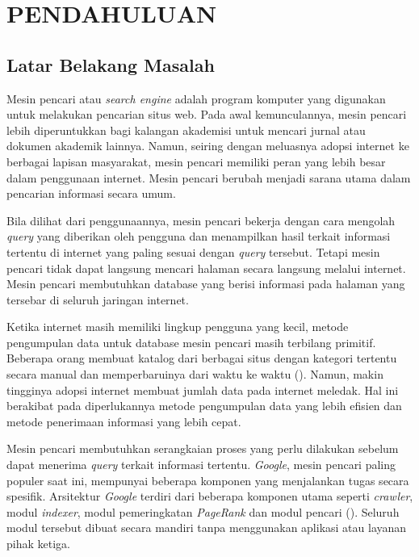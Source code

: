 
\chapter{PENDAHULUAN}

\section{Latar Belakang Masalah}

Mesin pencari atau \emph{search engine} adalah program komputer yang digunakan 
untuk melakukan pencarian situs web. Pada awal kemunculannya, mesin pencari
lebih diperuntukkan bagi kalangan akademisi untuk mencari jurnal atau dokumen
akademik lainnya. Namun, seiring dengan meluasnya adopsi internet ke berbagai
lapisan masyarakat, mesin pencari memiliki peran yang lebih besar dalam
penggunaan internet. Mesin pencari berubah menjadi sarana utama dalam pencarian
informasi secara umum.

Bila dilihat dari penggunaannya, mesin pencari bekerja dengan cara mengolah
\emph{query} yang diberikan oleh pengguna dan menampilkan hasil terkait
informasi tertentu di internet yang paling sesuai dengan \emph{query} tersebut.
Tetapi mesin pencari tidak dapat langsung mencari halaman secara langsung 
melalui internet. Mesin pencari membutuhkan database yang berisi informasi pada
halaman yang tersebar di seluruh jaringan internet. 

Ketika internet masih memiliki lingkup pengguna yang kecil, metode pengumpulan
data untuk database mesin pencari masih terbilang primitif. Beberapa orang 
membuat katalog dari berbagai situs dengan kategori tertentu secara manual dan 
memperbaruinya dari waktu ke waktu (\cite{seymour2011history}). Namun, makin
tingginya adopsi internet membuat jumlah data pada internet meledak. Hal ini
berakibat pada diperlukannya metode pengumpulan data yang lebih efisien dan
metode penerimaan informasi yang lebih cepat.

Mesin pencari membutuhkan serangkaian proses yang perlu dilakukan sebelum dapat
menerima \emph{query} terkait informasi tertentu. \emph{Google}, mesin pencari
paling populer saat ini, mempunyai beberapa komponen yang menjalankan tugas
secara spesifik. Arsitektur \emph{Google} terdiri dari beberapa komponen utama
seperti \emph{crawler}, modul \emph{indexer}, modul pemeringkatan
\emph{PageRank} dan modul pencari (\cite{brin1998google}). Seluruh modul
tersebut dibuat secara mandiri tanpa menggunakan aplikasi atau layanan pihak
ketiga.

